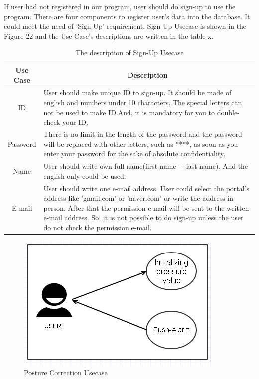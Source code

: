 \documentclass[conference]{IEEEtran}
\begin{document}
 
If user had not registered in our program, user should do sign-up to use the program. There are four components to register user's data into the database. It could meet the need of 'Sign-Up' requirement. Sign-Up Usecase is shown in the Figure 22 and the Use Case's descriptions are written in the table x.

\begin{table}[h]
{\renewcommand\arraystretch{1.25}
\caption{The description of Sign-Up Usecase}
\begin{tabular}{|c|l|l|} \hline
Use Case & \multicolumn{2}{c|}{Description} \\ \hline\hline
ID& \multicolumn{2}{p{6.75cm}|}{\raggedright User should make unique ID to sign-up. It should be made of english and numbers under 10 characters. The special letters can not be used to make ID.And, it is mandatory for you to double-check your ID.} \\ \hline
Password & \multicolumn{2}{p{6.75cm}|}{\raggedright There is  no limit in the length of the password and the password will be replaced with other letters, such as ****, as soon as you enter your password for the sake of absolute confidentiality.} \\ \hline
Name& \multicolumn{2}{p{6.75cm}|}{\raggedright User should write own full name(first name + last name). And the english only could be used.} \\ \hline
E-mail& \multicolumn{2}{p{6.75cm}|}{\raggedright User should write one e-mail address. User could select the portal's address like 'gmail.com' or 'naver.com' or write the address in person. After that the permission e-mail will be sent to the written e-mail address. So, it is not possible to do sign-up unless the user do not check the permission e-mail.} \\ \hline
\end{tabular}}
\end{table} 

\begin{figure}[H]
\begin{center}
    \includegraphics[scale=0.8]{img_20.png}
    \caption{Posture Correction Usecase} 
\end{center}
\end{figure}
 	  
\end{document}
